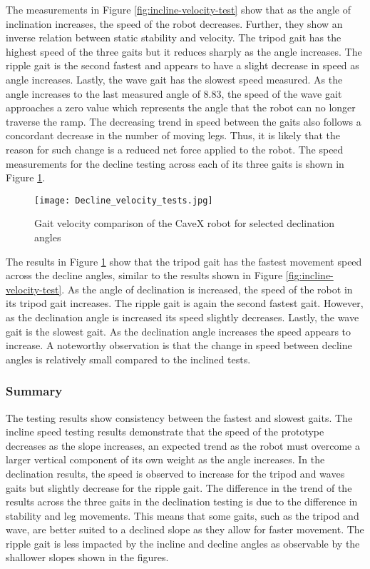 The measurements in Figure \ref{fig:incline-velocity-test} show that as the angle of inclination increases, the speed of the robot decreases. Further, they show an inverse relation between static stability and velocity. The tripod gait has the highest speed of the three gaits but it reduces sharply as the angle increases. The ripple gait is the second fastest and appears to have a slight decrease in speed as angle increases. Lastly, the wave gait has the slowest speed measured. As the angle increases to the last measured angle of 8.83\textdegree, the speed of the wave gait approaches a zero value which represents the angle that the robot can no longer traverse the ramp. The decreasing trend in speed between the gaits also follows a concordant decrease in the number of moving legs. Thus, it is likely that the reason for such change is a reduced net force applied to the robot. The speed measurements for the decline testing across each of its three gaits is shown in Figure \ref{fig:decline-velocity-test}.

\begin{figure}[H]
    \centering
    \texttt{[image: Decline\_velocity\_tests.jpg]}
    \caption{Gait velocity comparison of the CaveX robot for selected declination angles}
    \label{fig:decline-velocity-test}
\end{figure}

The results in Figure \ref{fig:decline-velocity-test} show that the tripod gait has the fastest movement speed across the decline angles, similar to the results shown in Figure \ref{fig:incline-velocity-test}. As the angle of declination is increased, the speed of the robot in its tripod gait increases. The ripple gait is again the second fastest gait. However, as the declination angle is increased its speed slightly decreases. Lastly, the wave gait is the slowest gait. As the declination angle increases the speed appears to increase. A noteworthy observation is that the change in speed between decline angles is relatively small compared to the inclined tests.

\subsubsection{Summary}
The testing results show consistency between the fastest and slowest gaits. The incline speed testing results demonstrate that the speed of the prototype decreases as the slope increases, an expected trend as the robot must overcome a larger vertical component of its own weight as the angle increases. In the declination results, the speed is observed to increase for the tripod and waves gaits but slightly decrease for the ripple gait. The difference in the trend of the results across the three gaits in the declination testing is due to the difference in stability and leg movements. This means that some gaits, such as the tripod and wave, are better suited to a declined slope as they allow for faster movement. The ripple gait is less impacted by the incline and decline angles as observable by the shallower slopes shown in the figures.